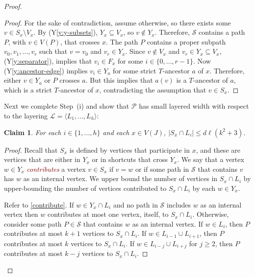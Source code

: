 \documentclass{patmorin}
\theoremstyle{plain}
\newtheorem{clm}{Claim}
\theoremstyle{definition}
\newcommand{\defin}[1]{\textcolor{Maroon}{\emph{#1}}}
\newcommand{\note}[2]{\noindent{\color{red}[#1:~#2]}}
\newcommand{\referee}[2]{\noindent\textcolor{blue}{\framebox{\begin{minipage}{\textwidth} Ref \#{#1}: #2\end{minipage}}}}
\newcommand{\yref}[1]{(Y\ref{y:#1})}
\newcommand{\PP}{\mathcal{P}}
\renewcommand{\SS}{\mathcal{S}}
\renewcommand{\ge}{\geqslant}
\renewcommand{\le}{\leqslant}
\begin{document}
\begin{proof}
\begin{proof}
  For the sake of contradiction, assume otherwise, so there exists some $v\in S_x\setminus V_x$. By \yref{y-subsets}, $Y_x\subseteq V_x$, so $v\not\in Y_x$.  Therefore, $\SS$ contains a path $P$, with $v\in V(P)$, that crosses $x$.  The path $P$ contains a proper subpath $v_0,v_1,\ldots,v_{r}$ such that $v=v_0$ and $v_r\in Y_x$. Since $v\not\in V_x$ and $v_r\in Y_x\subseteq V_x$, \yref{separator}, implies that $v_i\in F_x$ for some $i\in\{0,\ldots,r-1\}$. Now \yref{ancestor-edge} implies $v_i\in Y_a$ for some strict $T$-ancestor $a$ of $x$.  Therefore, either $v\in Y_a$ or $P$ crosses $a$. But this implies that $a(v)$ is a $T$-ancestor of $a$, which is a strict $T$-ancestor of $x$, contradicting the assumption that $v\in S_x$.
\end{proof}

Next we complete Step~(i) and show that $\PP$ has small layered width with respect to the layering $\mathcal{L}=\langle L_1,\ldots,L_h\rangle$:

\begin{clm}
	\label{general-width}
  For each $i\in\{1,\ldots,h\}$ and each $x\in V(J)$, $|S_x\cap L_i|\le d\ell(k^2+3)$.
\end{clm}

\begin{proof}
  Recall that $S_x$ is defined by vertices that participate in $x$, and these are vertices that are either in $Y_x$ or in shortcuts that cross $Y_x$.  We say that a vertex $w\in Y_x$ \defin{contributes} a vertex $v\in S_x$ if $v=w$ or if some path in $\SS$ that contains $v$ has $w$ as an internal vertex.
  We upper bound the number of vertices in $S_x\cap L_i$ by upper-bounding the number of vertices contributed to $S_x\cap L_i$ by each $w\in Y_x$.

  Refer to \cref{contribute}.  If $w\in Y_x\cap L_i$ and no path in $\SS$ includes $w$ as an internal vertex then $w$ contributes at most one vertex, itself, to $S_x\cap L_i$.
  Otherwise, consider some path $P\in\SS$ that contains $w$ as an internal vertex.  If $w\in L_{i}$, then $P$ contributes at most $k+1$ vertices to $S_x\cap L_i$.  If $w\in L_{i-1}\cup L_{i+1}$, then $P$ contributes at most $k$ vertices to $S_x\cap L_i$. If $w\in L_{i-j}\cup L_{i+j}$ for $j\ge 2$, then $P$ contributes at most $k-j$ vertices to $S_x\cap L_i$.
%
%


\end{proof}
\end{proof}
\end{document}
